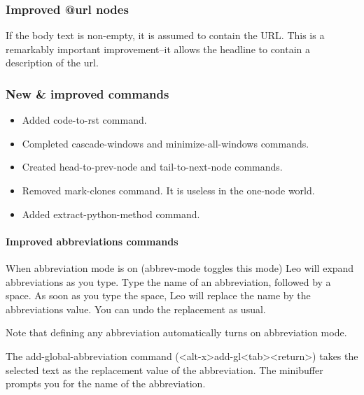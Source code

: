 \documentclass[a4paper,10pt,english]{sphinxmanual}
\begin{document}
\subsubsection{Improved @url nodes}
\label{what-is-new:improved-url-nodes}
If the body text is non-empty, it is assumed to contain the URL.
This is a remarkably important improvement--it allows the
headline to contain a description of the url.


\subsubsection{New \& improved commands}
\label{what-is-new:new-improved-commands}\begin{itemize}
\item {} 
Added code-to-rst command.

\item {} 
Completed cascade-windows and minimize-all-windows commands.

\item {} 
Created head-to-prev-node and tail-to-next-node commands.

\item {} 
Removed mark-clones command.  It is useless in the one-node world.

\item {} 
Added extract-python-method command.

\end{itemize}


\paragraph{Improved abbreviations commands}
\label{what-is-new:improved-abbreviations-commands}
When abbreviation mode is on (abbrev-mode toggles this mode) Leo will expand
abbreviations as you type. Type the name of an abbreviation, followed by a
space. As soon as you type the space, Leo will replace the name by the
abbreviations value. You can undo the replacement as usual.

Note that defining any abbreviation automatically turns on abbreviation
mode.

The add-global-abbreviation command (\textless{}alt-x\textgreater{}add-gl\textless{}tab\textgreater{}\textless{}return\textgreater{}) takes the
selected text as the replacement value of the abbreviation. The minibuffer
prompts you for the name of the abbreviation.
\end{document}
